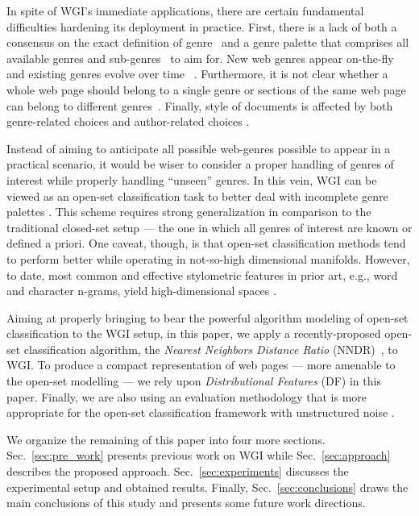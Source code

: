 \documentclass[runningheads]{llncs}
\begin{document}
In spite of WGI's immediate applications, there are certain fundamental difficulties hardening its deployment in practice. First, there is a lack of both a consensus on the exact definition of genre~\cite{crowston2011problems} and a genre palette that comprises all available genres and sub-genres~\cite{santini2011cross,mehler2010genres_on_web,mason2009n,sharoff2010web} to aim for. New web genres appear on-the-fly and existing genres evolve over time~ \cite{Boese2005}. Furthermore, it is not clear whether a whole web page should belong to a single genre or sections of the same web page can belong to different genres~\cite{jebari2015combination,madjarov2015web}. Finally, style of documents is affected by both genre-related choices and author-related choices \cite{petrenz2011stable,sharoff2010web}. 

Instead of aiming to anticipate all possible web-genres possible to appear in a practical scenario, it would be wiser to consider a proper handling of genres of interest while properly handling ``unseen'' genres. In this vein, 
WGI can be viewed as an open-set classification task to better deal with incomplete genre palettes \cite{Asheghi2015,pritsos2013open,pritsos2018open,pritsos2015clef,stubbe2007genre}. This scheme requires strong generalization in comparison to the traditional closed-set setup --- the one in which all genres of interest are known or defined a priori. One caveat, though, is that open-set classification methods tend to perform better while operating in not-so-high dimensional manifolds. However,  to date, most common and effective stylometric features in prior art, e.g., word and character n-grams, yield  high-dimensional spaces \cite{kanaris2009learning,sharoff2010web}. 

Aiming at properly bringing to bear the powerful algorithm modeling of open-set classification to the WGI setup, 
in this paper, we apply a recently-proposed open-set classification algorithm, the \textit{Nearest Neighbors Distance Ratio} (NNDR)~\cite{mendesjunior2016}, to WGI. To produce a compact representation of web pages --- more amenable to the open-set modelling --- we rely upon  \textit{Distributional Features} (DF) \cite{worsham2018genre} in this paper. Finally, we are also using an evaluation methodology that is more appropriate for the open-set classification framework with unstructured noise \cite{pritsos2018open}. 

We organize the remaining of this paper into four more sections. Sec.~\ref{sec:pre_work} presents previous work on WGI while Sec.~\ref{sec:approach} describes the proposed approach. Sec.~\ref{sec:experiments} discusses the experimental setup and obtained results. Finally, Sec.~\ref{sec:conclusions} draws the main conclusions of this study and presents some future work directions.
\end{document}
